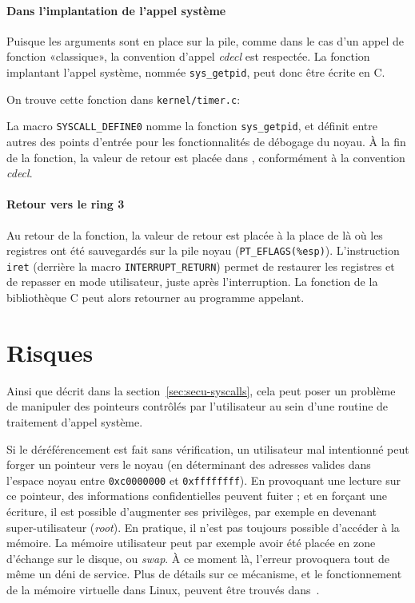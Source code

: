 \paragraph{Dans l'implantation de l'appel système}

Puisque les arguments sont en place sur la pile, comme dans le cas d'un appel de
fonction «classique», la convention d'appel \emph{cdecl} est respectée. La
fonction implantant l'appel système, nommée \texttt{sys\_getpid}, peut donc être
écrite en C.

On trouve cette fonction dans \texttt{kernel/timer.c}:


La macro \texttt{SYSCALL_DEFINE0} nomme la fonction \texttt{sys\_getpid}, et
définit entre autres des points d'entrée pour les fonctionnalités de débogage du
noyau. À la fin de la fonction, la valeur de retour est placée dans \eax,
conformément à la convention \emph{cdecl}.

\paragraph{Retour vers le ring 3}

Au retour de la fonction, la valeur de retour est placée à la place de \eax{} là
où les registres ont été sauvegardés sur la pile noyau
(\texttt{PT\_EFLAGS(\%esp)}). %
L'instruction \texttt{iret} (derrière la macro
\texttt{INTERRUPT\_RETURN}) permet de restaurer les registres et de repasser en
mode utilisateur, juste après l'interruption. La fonction de la bibliothèque C
peut alors retourner au programme appelant.

\section{Risques}

Ainsi que décrit dans la section~\ref{sec:secu-syscalls}, cela peut poser un
problème de manipuler des pointeurs contrôlés par l'utilisateur au sein d'une
routine de traitement d'appel système.

Si le déréférencement est fait sans vérification, un utilisateur mal intentionné
peut forger un pointeur vers le noyau (en déterminant des adresses valides dans
l'espace noyau entre \texttt{0xc0000000} et \texttt{0xffffffff}). En provoquant
une lecture sur ce pointeur, des informations confidentielles peuvent fuiter ;
et en forçant une écriture, il est possible d'augmenter ses privilèges, par
exemple en devenant super-utilisateur (\emph{root}). En pratique, il n'est pas
toujours possible d'accéder à la mémoire. La mémoire utilisateur peut par
exemple avoir été placée en zone d'échange sur le disque, ou \emph{swap}. À ce
moment là, l'erreur provoquera tout de même un déni de service. Plus de détails
sur ce mécanisme, et le fonctionnement de la mémoire virtuelle dans Linux,
peuvent être trouvés dans~\cite{userspaceaccess}.

